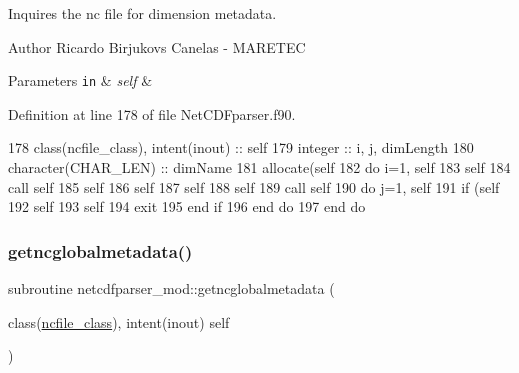Inquires the nc file for dimension metadata. 

\begin{DoxyAuthor}{Author}
Ricardo Birjukovs Canelas -\/ M\+A\+R\+E\+T\+EC 
\end{DoxyAuthor}

\begin{DoxyParams}[1]{Parameters}
\mbox{\tt in}  & {\em self} & \\
\hline
\end{DoxyParams}


Definition at line 178 of file Net\+C\+D\+Fparser.\+f90.


\begin{DoxyCode}
178     \textcolor{keywordtype}{class}(ncfile\_class), \textcolor{keywordtype}{intent(inout)} :: self
179     \textcolor{keywordtype}{integer} :: i, j, dimLength
180     \textcolor{keywordtype}{character(CHAR\_LEN)} :: dimName
181     \textcolor{keyword}{allocate}(self%
182     \textcolor{keywordflow}{do} i=1, self%
183         self%
184         \textcolor{keyword}{call }self%
185         self%
186         self%
187         self%
188         self%
189         \textcolor{keyword}{call }self%
190         \textcolor{keywordflow}{do} j=1, self%
191             \textcolor{keywordflow}{if} (self%
192                 self%
193                 self%
194                 \textcolor{keywordflow}{exit}
195 \textcolor{keywordflow}{            end if}
196 \textcolor{keywordflow}{        end do}
197 \textcolor{keywordflow}{    end do}
\end{DoxyCode}
\mbox{\label{namespacenetcdfparser__mod_a409f59662d71fb63e5fb5e057fdfd6ee}} 
\subsubsection{\texorpdfstring{getncglobalmetadata()}{getncglobalmetadata()}}
{\footnotesize\ttfamily subroutine netcdfparser\+\_\+mod\+::getncglobalmetadata (\begin{DoxyParamCaption}\item[{class(\mbox{\hyperlink{structnetcdfparser__mod_1_1ncfile__class}{ncfile\+\_\+class}}), intent(inout)}]{self }\end{DoxyParamCaption})\hspace{0.3cm}{\ttfamily [private]}}



